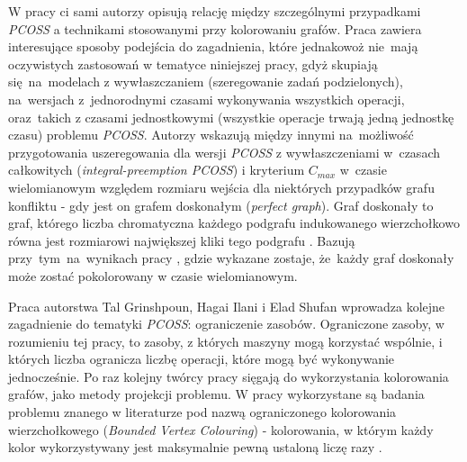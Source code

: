 \documentclass[brudnopis]{xmgr}
\begin{document}
W pracy \cite{ilani2016partially} ci sami autorzy opisują relację między szczególnymi przypadkami \emph{PCOSS} a technikami stosowanymi przy kolorowaniu grafów. Praca zawiera interesujące sposoby podejścia do zagadnienia, które jednakowoż nie~mają oczywistych zastosowań w tematyce niniejszej pracy, gdyż skupiają się~na~modelach z wywłaszczaniem (szeregowanie zadań podzielonych), na~wersjach z~jednorodnymi czasami wykonywania wszystkich operacji, oraz~takich z czasami jednostkowymi (wszystkie operacje trwają jedną jednostkę czasu) problemu \emph{PCOSS}. Autorzy wskazują między innymi na~możliwość przygotowania uszeregowania dla wersji \emph{PCOSS} z wywłaszczeniami w~czasach całkowitych (\emph{integral-preemption PCOSS}) i kryterium $C_{max}$ w~czasie wielomianowym względem rozmiaru wejścia dla niektórych przypadków grafu konfliktu - gdy jest on grafem doskonałym (\emph{perfect graph}). Graf doskonały to graf, którego liczba chromatyczna każdego podgrafu indukowanego wierzchołkowo równa jest rozmiarowi największej kliki tego podgrafu \cite{diestel2010graph}. Bazują przy~tym~na~wynikach pracy \cite{grotschel1984polynomial}, gdzie wykazane zostaje, że~każdy graf doskonały może zostać pokolorowany w czasie wielomianowym.
\medskip

Praca \cite{ilani2018partially} autorstwa Tal Grinshpoun, Hagai Ilani i Elad Shufan wprowadza kolejne zagadnienie do tematyki \emph{PCOSS}: ograniczenie zasobów. Ograniczone zasoby, w rozumieniu tej pracy, to zasoby, z których maszyny mogą korzystać wspólnie, i których liczba ogranicza liczbę operacji, które mogą być wykonywanie jednocześnie. Po raz kolejny twórcy pracy sięgają do wykorzystania kolorowania grafów, jako metody projekcji problemu. W pracy wykorzystane są badania problemu znanego w literaturze pod nazwą ograniczonego kolorowania wierzchołkowego (\emph{Bounded Vertex Colouring}) - kolorowania, w którym każdy kolor wykorzystywany jest maksymalnie pewną ustaloną liczę razy \cite{hansen1993bounded}.



\end{document}
